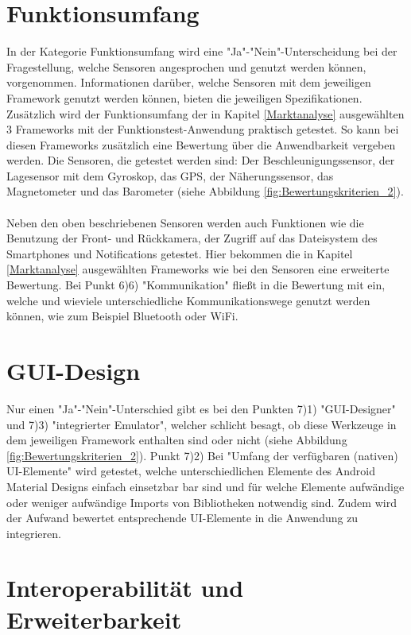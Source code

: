 \section{Funktionsumfang}

In der Kategorie Funktionsumfang wird eine "Ja"-"Nein"-Unterscheidung bei der Fragestellung, welche Sensoren angesprochen und genutzt werden können, vorgenommen. Informationen darüber, welche Sensoren mit dem jeweiligen Framework genutzt werden können, bieten die jeweiligen Spezifikationen. Zusätzlich wird der Funktionsumfang der in Kapitel \ref{Marktanalyse} ausgewählten 3 Frameworks mit der Funktionstest-Anwendung praktisch getestet. So kann bei diesen Frameworks zusätzlich eine Bewertung über die Anwendbarkeit vergeben werden. Die Sensoren, die getestet werden sind: Der Beschleunigungssensor, der Lagesensor mit dem Gyroskop, das GPS, der Näherungssensor, das Magnetometer und das Barometer (siehe Abbildung \ref{fig:Bewertungskriterien_2}). 
\\
\\
Neben den oben beschriebenen Sensoren werden auch Funktionen wie die Benutzung der Front- und Rückkamera, der Zugriff auf das Dateisystem des Smartphones und Notifications getestet. Hier bekommen die in Kapitel \ref{Marktanalyse} ausgewählten Frameworks wie bei den Sensoren eine erweiterte Bewertung. Bei Punkt 6)6) "Kommunikation" fließt in die Bewertung mit ein, welche und wieviele unterschiedliche Kommunikationswege genutzt werden können, wie zum Beispiel Bluetooth oder WiFi. 

\section{GUI-Design}

Nur einen "Ja"-"Nein"-Unterschied gibt es bei den Punkten 7)1) "GUI-Designer" und 7)3) "integrierter Emulator", welcher schlicht besagt, ob diese Werkzeuge in dem jeweiligen Framework enthalten sind oder nicht (siehe Abbildung \ref{fig:Bewertungskriterien_2}). Punkt 7)2) Bei "Umfang der verfügbaren (nativen) UI-Elemente" wird getestet, welche unterschiedlichen Elemente des Android Material Designs einfach einsetzbar bar sind und für welche Elemente aufwändige oder weniger aufwändige Imports von Bibliotheken notwendig sind. Zudem wird der Aufwand bewertet entsprechende UI-Elemente in die Anwendung zu integrieren. 

\section{Interoperabilität und Erweiterbarkeit}

